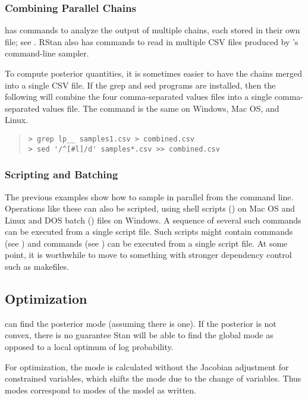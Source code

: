 \subsubsection{Combining Parallel Chains}

\CmdStan has commands to analyze the output of multiple chains, each
stored in their own file; see .  RStan also
has commands to read in multiple CSV files produced by \CmdStan's
command-line sampler.

To compute posterior quantities, it is sometimes easier to have the
chains merged into a single CSV file.  If the grep and sed programs
are installed, then the following will combine the four
comma-separated values files into a single comma-separated values
file.  The command is the same on Windows, Mac OS, and Linux.
%
\begin{quote}
\begin{Verbatim}[fontshape=sl]
> grep lp__ samples1.csv > combined.csv
> sed '/^[#l]/d' samples*.csv >> combined.csv
\end{Verbatim}
\end{quote}

\subsubsection{Scripting and Batching}

The previous examples show how to sample in parallel from the command
line.  Operations like these can also be scripted, using shell scripts
() on Mac OS and Linux and DOS batch () files on
Windows.  A sequence of several such commands can be executed from a
single script file.  Such scripts might contain  commands
(see ) and  commands (see
) can be executed from a single script file.
At some point, it is worthwhile to move to something with stronger
dependency control such as makefiles.


\subsection{Optimization}

\CmdStan can find the posterior mode (assuming there is one).  If the
posterior is not convex, there is no guarantee Stan will be able to
find the global mode as opposed to a local optimum of log probability.

For optimization, the mode is calculated without the Jacobian
adjustment for constrained variables, which shifts the mode due to the
change of variables.  Thus modes correspond to modes of the model as
written.


